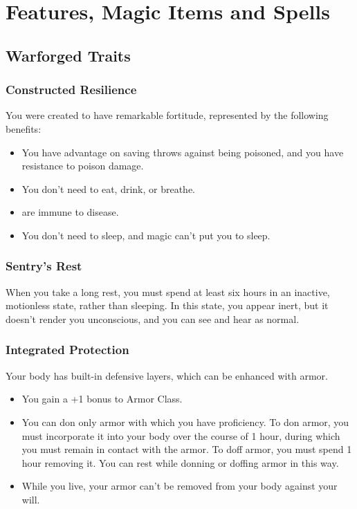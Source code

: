 \documentclass[letterpaper,openany,oneside,twocolumn]{book}
\begin{document}
\onecolumn


\rendercharactersheet

\renderbackgroundsheet

\renderspellsheet



\restoregeometry
\twocolumn

\chapter*{Features, Magic Items and Spells}

\section*{Warforged Traits}
\subsection*{Constructed Resilience}
You were created to have remarkable fortitude, represented by the following benefits:
\begin{itemize}
	\item You have advantage on saving throws against being poisoned, and you have resistance to poison damage.
	\item You don't need to eat, drink, or breathe.
	\item  are immune to disease.
	\item You don't need to sleep, and magic can't put you to sleep.
\end{itemize}
\subsection*{Sentry's Rest}
When you take a long rest, you must spend at least six hours in an inactive, motionless state, rather than sleeping. In this state, you appear inert, but it doesn't render you unconscious, and you can see and hear as normal.
\subsection*{Integrated Protection}
Your body has built-in defensive layers, which can be enhanced with armor.
\begin{itemize}
	\item You gain a +1 bonus to Armor Class.
	\item You can don only armor with which you have proficiency. To don armor, you must incorporate it into your body over the course of 1 hour, during which you must remain in contact with the armor. To doff armor, you must spend 1 hour removing it. You can rest while donning or doffing armor in this way.
	\item While you live, your armor can't be removed from your body against your will.
\end{itemize}
\end{document}
